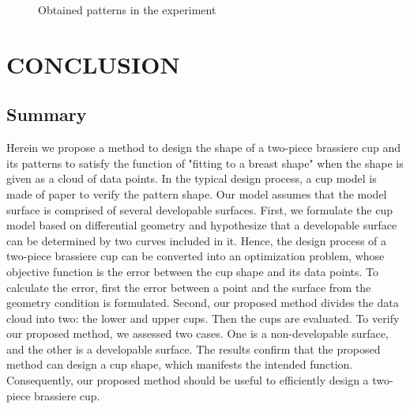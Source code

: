 \documentclass[E]{scitrans}
\begin{document}
\begin{figure}[h]
	\centering
	\hfil
	
	\caption{Obtained patterns in the experiment}
	\label{fig:ObtainedSurfaceNDS2_Pat}
\end{figure}


\section*{CONCLUSION}
\subsection*{Summary}
Herein we propose a method to design the shape of a two-piece brassiere cup and its patterns to satisfy the function of "fitting to a breast shape" when the shape is given as a cloud of data points. In the typical design process, a cup model is made of paper to verify the pattern shape. Our model assumes that the model surface is comprised of several developable surfaces. First, we formulate the cup model based on differential geometry and hypothesize that a developable surface can be determined by two curves included in it. Hence, the design process of a two-piece brassiere cup can be converted into an optimization problem, whose objective function is the error between the cup shape and its data points. To calculate the error, first the error between a point and the surface from the geometry condition is formulated. Second, our proposed method divides the data cloud into two: the lower and upper cups. Then the cups are evaluated. To verify our proposed method, we assessed two cases. One is a non-developable surface, and the other is a developable surface. The results confirm that the proposed method can design a cup shape, which manifests the intended function. Consequently, our proposed method should be useful to efficiently design a two-piece brassiere cup. 
\end{document}
